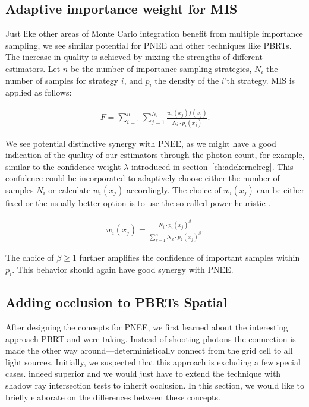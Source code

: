 \subsection{Adaptive importance weight for MIS}

Just like other areas of Monte Carlo integration benefit from multiple importance sampling, we see similar potential for PNEE and other techniques like PBRTs. The increase in quality is achieved by mixing the strengths of different estimators. Let $n$ be the number of importance sampling strategies, $N_i$ the number of samples for strategy $i$, and $p_i$ the density of the $i$'th strategy. MIS is applied as follows:

\begin{align}
F = \sum_{i=1}^{n}\sum_{j=1}^{N_i}\frac{w_i(x_j)f(x_j)}{N_i \cdot p_i(x_j)}.
\label{eq:mis}
\end{align}

We see potential distinctive synergy with PNEE, as we might have a good indication of the quality of our estimators through the photon count, for example, similar to the confidence weight $\lambda$ introduced in section~\ref{ch:adckernelreg}. This confidence could be incorporated to adaptively choose either the number of samples $N_i$ or calculate $w_i(x_j)$ accordingly. The choice of $w_i(x_j)$ can be either fixed or the usually better option is to use the so-called power heuristic \parencite{veach1997robust}.

\begin{align}
w_i(x_j) = \frac{N_i \cdot p_i(x_j)^\beta}{\sum_{k=1}^{n} N_k \cdot p_k(x_j)^\beta}.
\label{eq:powerheuristic}
\end{align}

The choice of $\beta \geq 1$ further amplifies the confidence of important samples within $p_i$. This behavior should again have good synergy with PNEE.


\subsection{Adding occlusion to PBRTs Spatial}
\label{sec:pbrtoccl}

After designing the concepts for PNEE, we first learned about the interesting approach PBRT and \textcite{Vevoda} were taking. Instead of shooting photons the connection is made the other way around---deterministically connect from the grid cell to all light sources. Initially, we suspected that this approach is excluding a few special cases. indeed superior and we would just have to extend the technique with shadow ray intersection tests to inherit occlusion. In this section, we would like to briefly elaborate on the differences between these concepts.

